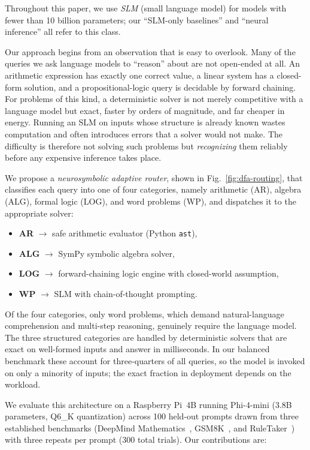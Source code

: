 \documentclass[journal]{IEEEtai}
\begin{document}
Throughout this paper, we use \textit{SLM} (small language model) for models with fewer than 10 billion parameters; our ``SLM-only baselines'' and ``neural inference'' all refer to this class.

Our approach begins from an observation that is easy to overlook. Many of the queries we ask language models to ``reason'' about are not open-ended at all. An arithmetic expression has exactly one correct value, a linear system has a closed-form solution, and a propositional-logic query is decidable by forward chaining. For problems of this kind, a deterministic solver is not merely competitive with a language model but exact, faster by orders of magnitude, and far cheaper in energy. Running an SLM on inputs whose structure is already known wastes computation and often introduces errors that a solver would not make. The difficulty is therefore not solving such problems but \emph{recognizing} them reliably before any expensive inference takes place.

We propose a \textit{neurosymbolic adaptive router}, shown in Fig.~\ref{fig:dfa-routing}, that classifies each query into one of four categories, namely arithmetic (AR), algebra (ALG), formal logic (LOG), and word problems (WP), and dispatches it to the appropriate solver:
\begin{itemize}
    \item \textbf{AR} $\rightarrow$ safe arithmetic evaluator (Python \texttt{ast}),
    \item \textbf{ALG} $\rightarrow$ SymPy symbolic algebra solver,
    \item \textbf{LOG} $\rightarrow$ forward-chaining logic engine with closed-world assumption,
    \item \textbf{WP} $\rightarrow$ SLM with chain-of-thought prompting.
\end{itemize}

Of the four categories, only word problems, which demand natural-language comprehension and multi-step reasoning, genuinely require the language model. The three structured categories are handled by deterministic solvers that are exact on well-formed inputs and answer in milliseconds. In our balanced benchmark these account for three-quarters of all queries, so the model is invoked on only a minority of inputs; the exact fraction in deployment depends on the workload.

We evaluate this architecture on a Raspberry Pi~4B running Phi-4-mini (3.8B parameters, Q6\_K quantization) across 100 held-out prompts drawn from three established benchmarks (DeepMind Mathematics~\cite{saxton2019deepmind}, GSM8K~\cite{cobbe2021gsm8k}, and RuleTaker~\cite{clark2020ruletaker}) with three repeats per prompt (300 total trials). Our contributions are:
\end{document}
